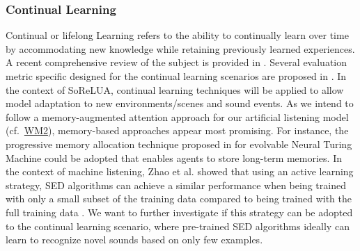 \documentclass[11pt]{article}
\newcommand{\wpref}[2]{\hyperlink{sec:W#1}{#2}}
\begin{document}
\subsubsection{Continual Learning}

Continual or lifelong Learning \cite{thrun1995lifelong} refers to the ability to continually learn over time by accommodating new knowledge while retaining previously learned experiences.
A recent comprehensive review of the subject is provided in \cite{parisi2019continual}.
Several evaluation metric specific designed for the continual learning scenarios are proposed in \cite{lopez2017gradient}.
In the context of SoReLUA, continual learning techniques will be applied to allow model adaptation to new environments/scenes and sound events.
As we intend to follow a memory-augmented attention approach for our artificial listening model (cf.~\wpref{M2}{WM2}), memory-based approaches appear most promising.
For instance, the progressive memory allocation technique proposed in \cite{luders2016continual} for evolvable Neural Turing Machine could be adopted that enables agents to store long-term memories. 
In the context of machine listening, Zhao et al. showed that using an active learning strategy, SED algorithms can achieve a similar performance when being trained with only a small subset of the training data compared to being trained with the full training data \cite{Zhao:2020:ActiveLearningSED:ARXIV}. We want to further investigate if this strategy can be adopted to the continual learning scenario, where pre-trained SED algorithms ideally can learn to recognize novel sounds based on only few examples.



\end{document}
